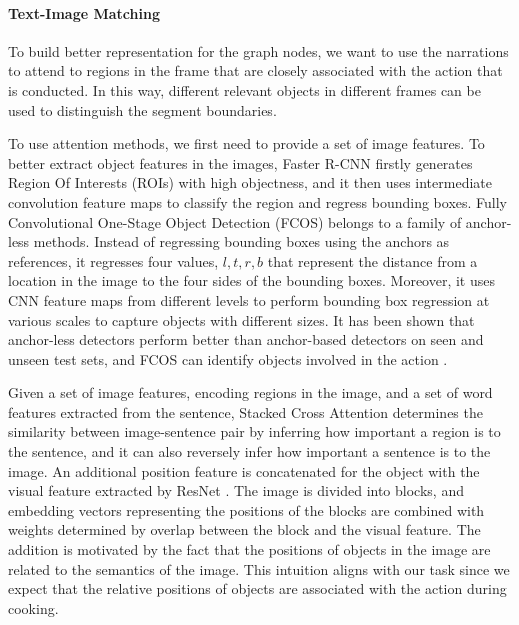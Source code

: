 \paragraph{Text-Image Matching}
To build better representation for the graph nodes, we want to use the narrations to attend to regions in the frame that are closely associated with the action that is conducted. In this way, different relevant objects in different frames can be used to distinguish the segment boundaries. 

To use attention methods, we first need to provide a set of image features. To better extract object features in the images, Faster R-CNN \cite{ren2016faster} firstly generates Region Of Interests (ROIs) with high objectness, and it then uses intermediate convolution feature maps to classify the region and regress bounding boxes. Fully Convolutional One-Stage Object Detection (FCOS) \cite{tian2019fcos} belongs to a family of anchor-less methods. Instead of regressing bounding boxes using the anchors as references, it regresses four values, $l,t,r,b$ that represent the distance from a location in the image to the four sides of the bounding boxes. Moreover, it uses CNN feature maps from different levels to perform bounding box regression at various scales to capture objects with different sizes. It has been shown that anchor-less detectors perform better than anchor-based detectors on seen and unseen test sets, and FCOS can identify objects involved in the action \cite{yoon2020semisupervised}.  

Given a set of image features, encoding regions in the image, and a set of word features extracted from the sentence, Stacked Cross Attention \cite{lee2018stacked} determines the similarity between image-sentence pair by inferring how important a region is to the sentence, and it can also reversely infer how important a sentence is to the image. An additional position feature is concatenated for the object with the visual feature extracted by ResNet \cite{wang2019position}. The image is divided into blocks, and embedding vectors representing the positions of the blocks are combined with weights determined by overlap between the block and the visual feature. The addition is motivated by the fact that the positions of objects in the image are related to the semantics of the image. This intuition aligns with our task since we expect that the relative positions of objects are associated with the action during cooking.